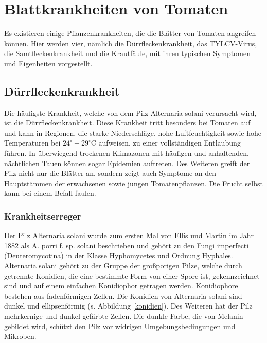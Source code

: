 \newpage
\section{Blattkrankheiten von Tomaten}
\label{sec:Blattkrankheiten}

Es existieren einige Pflanzenkrankheiten, die die Blätter von Tomaten angreifen können. Hier werden vier, nämlich die Dürrfleckenkrankheit, das TYLCV-Virus, die Samtfleckenkrankheit und die Krautfäule, mit ihren typischen Symptomen und Eigenheiten vorgestellt. 


\subsection{Dürrfleckenkrankheit}


Die häufigste Krankheit, welche von dem Pilz Alternaria solani verursacht wird, ist die Dürrfleckenkrankheit\cite{borner}. Diese Krankheit tritt besonders bei Tomaten auf und kann in Regionen, die starke Niederschläge, hohe Luftfeuchtigkeit sowie hohe Temperaturen bei $24^\circ-29^\circ\text{C}$ aufweisen, zu einer vollständigen Entlaubung führen. In überwiegend trockenen Klimazonen mit häufigen und anhaltenden, nächtlichen Tauen können sogar Epidemien auftreten. Des Weiteren greift der Pilz nicht nur die Blätter an, sondern zeigt auch Symptome an den Hauptstämmen der erwachsenen sowie jungen Tomatenpflanzen. Die Frucht selbst kann bei einem Befall faulen\cite{solani}. 


\subsubsection{Krankheitserreger}

Der Pilz Alternaria solani wurde zum ersten Mal von Ellis und Martin im Jahr 1882 als A. porri f. sp. solani beschrieben und gehört zu den Fungi imperfecti (Deuteromycotina) in der Klasse Hyphomycetes und Ordnung Hyphales. Alternaria solani gehört zu der Gruppe der großporigen Pilze, welche durch getrennte Konidien, die eine bestimmte Form von einer Spore ist, gekennzeichnet sind und auf einem einfachen Konidiophor getragen werden. Konidiophore bestehen aus fadenförmigen Zellen. Die Konidien von Alternaria solani sind dunkel und ellipsenförmig (s. Abbildung \ref{konidien}). Des Weiteren hat der Pilz mehrkernige und dunkel gefärbte Zellen. Die dunkle Farbe, die von Melanin gebildet wird, schützt den Pilz vor widrigen Umgebungsbedingungen und Mikroben\cite{solani}.

